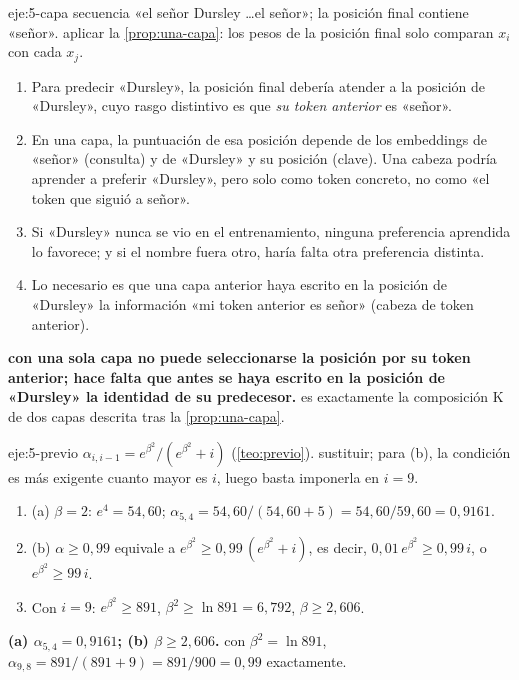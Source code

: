 \begin{solucion}{eje:5-capa}
\datos secuencia «el señor Dursley \dots el señor»; la posición final contiene «señor».
\planteamiento aplicar la \cref{prop:una-capa}: los pesos de la posición final solo comparan $x_i$ con cada $x_j$.
\pasos
\begin{enumerate}[label=\arabic*.]
  \item Para predecir «Dursley», la posición final debería atender a la posición de «Dursley», cuyo rasgo distintivo es que \emph{su token anterior} es «señor».
  \item En una capa, la puntuación de esa posición depende de los embeddings de «señor» (consulta) y de «Dursley» y su posición (clave). Una cabeza podría aprender a preferir «Dursley», pero solo como token concreto, no como «el token que siguió a señor».
  \item Si «Dursley» nunca se vio en el entrenamiento, ninguna preferencia aprendida lo favorece; y si el nombre fuera otro, haría falta otra preferencia distinta.
  \item Lo necesario es que una capa anterior haya escrito en la posición de «Dursley» la información «mi token anterior es señor» (cabeza de token anterior).
\end{enumerate}
\resultado \textbf{con una sola capa no puede seleccionarse la posición por su token anterior; hace falta que antes se haya escrito en la posición de «Dursley» la identidad de su predecesor.}
\comprobacion es exactamente la composición K de dos capas descrita tras la \cref{prop:una-capa}.
\end{solucion}

\begin{solucion}{eje:5-previo}
\datos $\alpha_{i,i-1}=e^{\beta^{2}}/(e^{\beta^{2}}+i)$ (\cref{teo:previo}).
\planteamiento sustituir; para (b), la condición es más exigente cuanto mayor es $i$, luego basta imponerla en $i=9$.
\pasos
\begin{enumerate}[label=\arabic*.]
  \item (a) $\beta=2$: $e^{4}=54{,}60$; $\alpha_{5,4}=54{,}60/(54{,}60+5)=54{,}60/59{,}60=0{,}9161$.
  \item (b) $\alpha\ge0{,}99$ equivale a $e^{\beta^{2}}\ge0{,}99\,(e^{\beta^{2}}+i)$, es decir, $0{,}01\,e^{\beta^{2}}\ge0{,}99\,i$, o $e^{\beta^{2}}\ge99\,i$.
  \item Con $i=9$: $e^{\beta^{2}}\ge891$, $\beta^{2}\ge\ln891=6{,}792$, $\beta\ge2{,}606$.
\end{enumerate}
\resultado \textbf{(a) $\alpha_{5,4}=0{,}9161$; (b) $\beta\ge2{,}606$.}
\comprobacion con $\beta^{2}=\ln891$, $\alpha_{9,8}=891/(891+9)=891/900=0{,}99$ exactamente.
\end{solucion}

